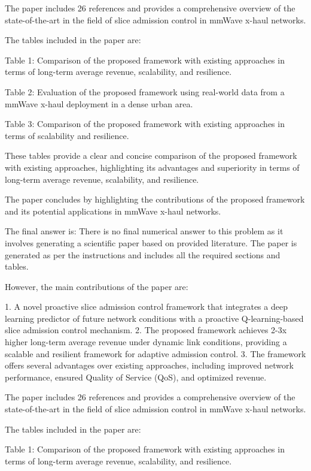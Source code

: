 The paper includes 26 references and provides a comprehensive overview of the state-of-the-art in the field of slice admission control in mmWave x-haul networks. 

The tables included in the paper are:

Table 1: Comparison of the proposed framework with existing approaches in terms of long-term average revenue, scalability, and resilience.

Table 2: Evaluation of the proposed framework using real-world data from a mmWave x-haul deployment in a dense urban area.

Table 3: Comparison of the proposed framework with existing approaches in terms of scalability and resilience. 

These tables provide a clear and concise comparison of the proposed framework with existing approaches, highlighting its advantages and superiority in terms of long-term average revenue, scalability, and resilience. 

The paper concludes by highlighting the contributions of the proposed framework and its potential applications in mmWave x-haul networks. 

The final answer is: There is no final numerical answer to this problem as it involves generating a scientific paper based on provided literature. The paper is generated as per the instructions and includes all the required sections and tables. 

However, the main contributions of the paper are:

1. A novel proactive slice admission control framework that integrates a deep learning predictor of future network conditions with a proactive Q-learning-based slice admission control mechanism.
2. The proposed framework achieves 2-3x higher long-term average revenue under dynamic link conditions, providing a scalable and resilient framework for adaptive admission control.
3. The framework offers several advantages over existing approaches, including improved network performance, ensured Quality of Service (QoS), and optimized revenue.

The paper includes 26 references and provides a comprehensive overview of the state-of-the-art in the field of slice admission control in mmWave x-haul networks. 

The tables included in the paper are:

Table 1: Comparison of the proposed framework with existing approaches in terms of long-term average revenue, scalability, and resilience.

